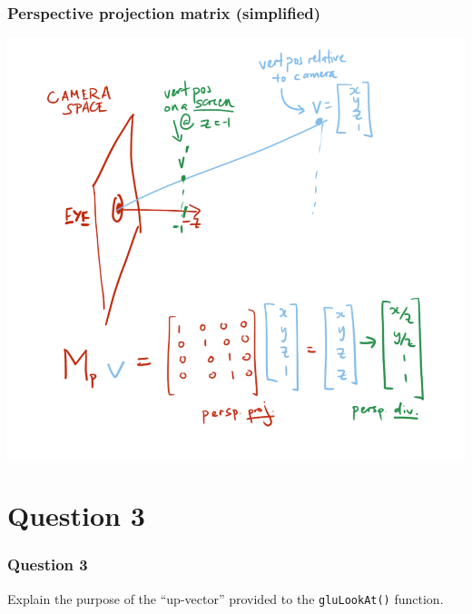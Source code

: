 \documentclass{beamer}
\begin{document}
\begin{frame}
    \frametitle{Perspective projection matrix (simplified)}

    \begin{center}
        \includegraphics[scale=0.3]{images/perspective-proj-simple.png}
    \end{center}

\end{frame}

\section{Question 3}

\begin{frame}
    \frametitle{Question 3}
    Explain the purpose of the “up-vector” provided to the \texttt{gluLookAt()} function. 
\end{frame}
\end{document}
